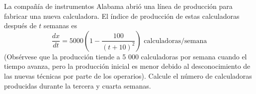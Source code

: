 \item La compañía de instrumentos Alabama abrió una línea de producción para fabricar una nueva calculadora. El índice de producción de estas calculadoras después de $t$ semanas es
$$\frac{dx}{dt} = 5000 \left( 1 - \frac{100}{(t + 10)^2} \right) \text{ calculadoras/semana}$$
(Obsérvese que la producción tiende a 5 000 calculadoras por semana cuando el tiempo avanza, pero la producción inicial es menor debido al desconocimiento de las nuevas técnicas por parte de los operarios). Calcule el número de calculadoras producidas durante la tercera y cuarta semanas.
